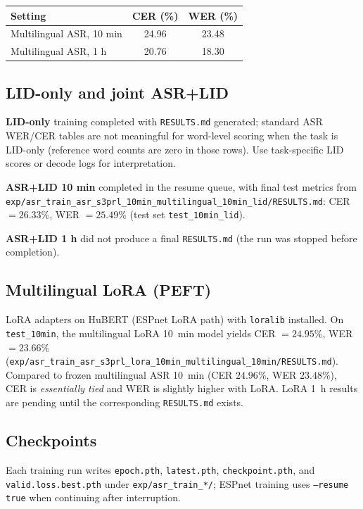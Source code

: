 \documentclass[11pt,a4paper]{article}
\begin{document}
\begin{center}
\begin{tabular}{lcc}
\toprule
\textbf{Setting} & \textbf{CER (\%)} & \textbf{WER (\%)} \\
\midrule
Multilingual ASR, 10 min & 24.96 & 23.48 \\
Multilingual ASR, 1 h & 20.76 & 18.30 \\
\bottomrule
\end{tabular}
\end{center}

\subsection{LID-only and joint ASR+LID}
\textbf{LID-only} training completed with \texttt{RESULTS.md} generated; standard ASR WER/CER tables are not meaningful for word-level scoring when the task is LID-only (reference word counts are zero in those rows). Use task-specific LID scores or decode logs for interpretation.

\textbf{ASR+LID 10 min} completed in the resume queue, with final test metrics from
\texttt{exp/asr\_train\_asr\_s3prl\_10min\_multilingual\_10min\_lid/RESULTS.md}:
CER $=26.33\%$, WER $=25.49\%$ (test set \texttt{test\_10min\_lid}).

\textbf{ASR+LID 1 h} did not produce a final \texttt{RESULTS.md} (the run was stopped before completion).

\subsection{Multilingual LoRA (PEFT)}
LoRA adapters on HuBERT (ESPnet LoRA path) with \texttt{loralib} installed. On \texttt{test\_10min}, the multilingual LoRA 10~min model yields CER $=24.95\%$, WER $=23.66\%$
(\texttt{exp/asr\_train\_asr\_s3prl\_lora\_10min\_multilingual\_10min/RESULTS.md}).
Compared to frozen multilingual ASR 10~min (CER $24.96\%$, WER $23.48\%$), CER is \emph{essentially tied} and WER is slightly higher with LoRA.
LoRA 1~h results are pending until the corresponding \texttt{RESULTS.md} exists.

\subsection{Checkpoints}
Each training run writes \texttt{epoch.pth}, \texttt{latest.pth}, \texttt{checkpoint.pth}, and \texttt{valid.loss.best.pth} under \texttt{exp/asr\_train\_*/}; ESPnet training uses \texttt{--resume true} when continuing after interruption.
\end{document}
